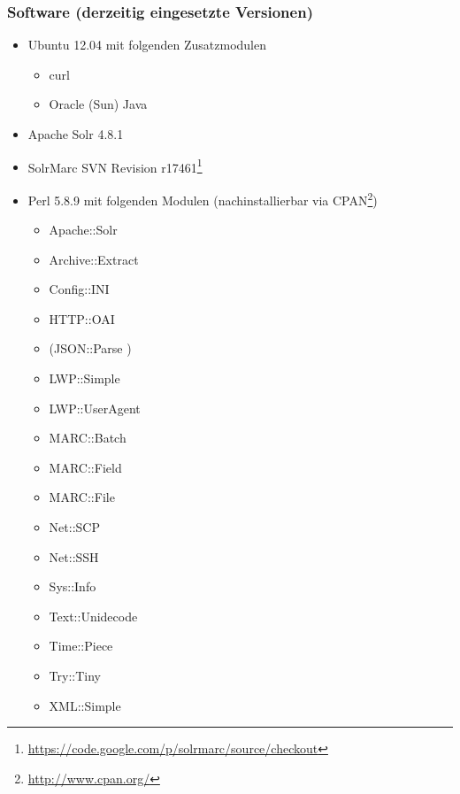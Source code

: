 \documentclass[10pt]{article}
\begin{document}
\subsubsection{Software (derzeitig eingesetzte Versionen)}
\begin{itemize}
	\item Ubuntu 12.04 mit folgenden Zusatzmodulen
	\begin{itemize}
		\item curl
		\item Oracle (Sun) Java
	\end{itemize}
	\item Apache Solr 4.8.1
	\item SolrMarc SVN Revision r17461\footnote{\url{https://code.google.com/p/solrmarc/source/checkout}}
	\item Perl 5.8.9 mit folgenden Modulen (nachinstallierbar via CPAN\footnote{\url{http://www.cpan.org/}})
	\begin{itemize}
		\item Apache::Solr %
		\item Archive::Extract	%
		\item Config::INI		%
		\item HTTP::OAI 		%
		\item (JSON::Parse )	%
		\item LWP::Simple 		%
		\item LWP::UserAgent 	%
		\item MARC::Batch 		%
		\item MARC::Field 		%
		\item MARC::File 		%
		\item Net::SCP 			%
		\item Net::SSH 			%
		\item Sys::Info 		%
		\item Text::Unidecode 	%
		\item Time::Piece 		%
		\item Try::Tiny 		%
		\item XML::Simple		%
	\end{itemize}
\end{itemize}
\end{document}
